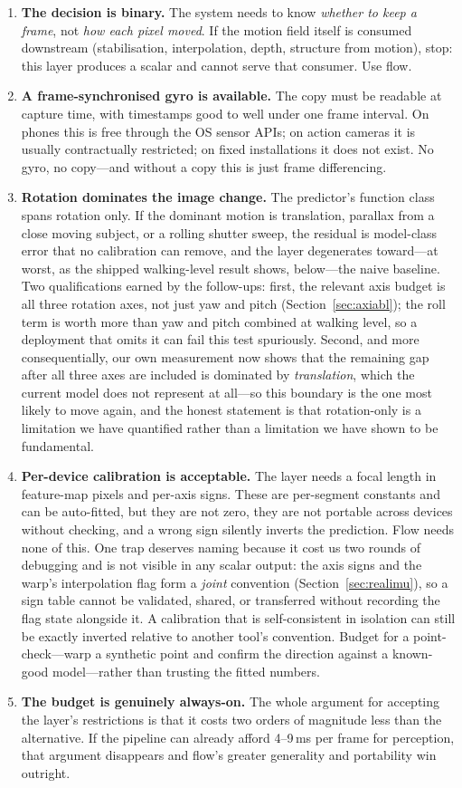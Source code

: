 \documentclass[12pt,a4paper]{article}
\begin{document}
\begin{enumerate}
  \item \textbf{The decision is binary.} The system needs to know \emph{whether to keep a frame}, not \emph{how each pixel moved}. If the motion field itself is consumed downstream (stabilisation, interpolation, depth, structure from motion), stop: this layer produces a scalar and cannot serve that consumer. Use flow.
  \item \textbf{A frame-synchronised gyro is available.} The copy must be readable at capture time, with timestamps good to well under one frame interval. On phones this is free through the OS sensor APIs; on action cameras it is usually contractually restricted; on fixed installations it does not exist. No gyro, no copy---and without a copy this is just frame differencing.
  \item \textbf{Rotation dominates the image change.} The predictor's function class spans rotation only. If the dominant motion is translation, parallax from a close moving subject, or a rolling shutter sweep, the residual is model-class error that no calibration can remove, and the layer degenerates toward---at worst, as the shipped walking-level result shows, below---the naive baseline. Two qualifications earned by the follow-ups: first, the relevant axis budget is all three rotation axes, not just yaw and pitch (Section~\ref{sec:axiabl}); the roll term is worth more than yaw and pitch combined at walking level, so a deployment that omits it can fail this test spuriously. Second, and more consequentially, our own measurement now shows that the remaining gap after all three axes are included is dominated by \emph{translation}, which the current model does not represent at all---so this boundary is the one most likely to move again, and the honest statement is that rotation-only is a limitation we have quantified rather than a limitation we have shown to be fundamental.
  \item \textbf{Per-device calibration is acceptable.} The layer needs a focal length in feature-map pixels and per-axis signs. These are per-segment constants and can be auto-fitted, but they are not zero, they are not portable across devices without checking, and a wrong sign silently inverts the prediction. Flow needs none of this. One trap deserves naming because it cost us two rounds of debugging and is not visible in any scalar output: the axis signs and the warp's interpolation flag form a \emph{joint} convention (Section~\ref{sec:realimu}), so a sign table cannot be validated, shared, or transferred without recording the flag state alongside it. A calibration that is self-consistent in isolation can still be exactly inverted relative to another tool's convention. Budget for a point-check---warp a synthetic point and confirm the direction against a known-good model---rather than trusting the fitted numbers.
  \item \textbf{The budget is genuinely always-on.} The whole argument for accepting the layer's restrictions is that it costs two orders of magnitude less than the alternative. If the pipeline can already afford 4--9\,ms per frame for perception, that argument disappears and flow's greater generality and portability win outright.
\end{enumerate}
\end{document}
